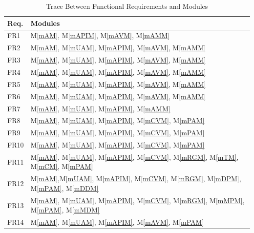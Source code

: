 \documentclass[12pt, titlepage]{article}
\newcommand{\mref}[1]{M\ref{#1}}
\begin{document}
\begin{table}[H]
\centering
\begin{tabular}{p{} p{}}
\toprule
\textbf{Req.} & \textbf{Modules}\\
\midrule
FR1 & \mref{mAM}, \mref{mAPIM}, \mref{mAVM}, \mref{mAMM}\\
FR2 & \mref{mAM}, \mref{mUAM}, \mref{mAPIM}, \mref{mAVM}, \mref{mAMM}\\
FR3 & \mref{mAM}, \mref{mUAM}, \mref{mAPIM}, \mref{mAVM}, \mref{mAMM}\\
FR4 & \mref{mAM}, \mref{mUAM}, \mref{mAPIM}, \mref{mAVM}, \mref{mAMM}\\
FR5 & \mref{mAM}, \mref{mUAM}, \mref{mAPIM}, \mref{mAVM}, \mref{mAMM}\\
FR6 & \mref{mAM}, \mref{mUAM}, \mref{mAPIM}, \mref{mAVM}, \mref{mAMM}\\
FR7 & \mref{mAM}, \mref{mUAM}, \mref{mAPIM}, \mref{mAMM}\\
FR8 & \mref{mAM}, \mref{mUAM}, \mref{mAPIM}, \mref{mCVM}, \mref{mPAM}\\
FR9 & \mref{mAM}, \mref{mUAM}, \mref{mAPIM}, \mref{mCVM}, \mref{mPAM}\\
FR10 & \mref{mAM}, \mref{mUAM}, \mref{mAPIM}, \mref{mCVM}, \mref{mPAM}\\
FR11 & \mref{mAM}, \mref{mUAM}, \mref{mAPIM}, \mref{mCVM}, \mref{mRGM}, \mref{mTM}, \mref{mCM}, \mref{mPAM}\\
FR12 & \mref{mAM},\mref{mUAM}, \mref{mAPIM}, \mref{mCVM}, \mref{mRGM}, \mref{mDPM}, \mref{mPAM}, \mref{mDDM}\\
FR13 & \mref{mAM}, \mref{mUAM}, \mref{mAPIM}, \mref{mCVM}, \mref{mRGM}, \mref{mMPM}, \mref{mPAM}, \mref{mMDM}\\
FR14 & \mref{mAM}, \mref{mUAM}, \mref{mAPIM}, \mref{mAVM}, \mref{mPAM}\\
\bottomrule
\end{tabular}
\caption{Trace Between Functional Requirements and Modules}
\label{TblRT}
\end{table}
\end{document}

